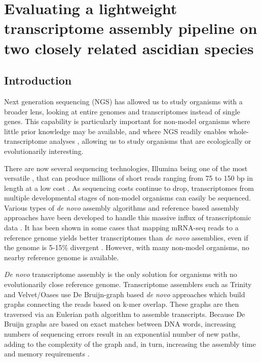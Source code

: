 \chapter{Evaluating a lightweight transcriptome assembly pipeline on two closely related ascidian species}



\section{Introduction}

Next generation sequencing (NGS) has allowed us to study organisms with a broader lens, looking at entire genomes and transcriptomes instead of single genes.  This capability is particularly important for non-model organisms where little prior knowledge may be available, and where NGS readily enables whole-transcriptome analyses \citep{wang_rna-seq:_2009}, allowing us to study organisms that are ecologically or evolutionarily interesting.

There are now several sequencing technologies, Illumina being one of the most versatile \citep{glenn_field_2011}, that can produce millions of short reads ranging from 75 to 150 bp in length at a low cost \citep{zhang_impact_2011}. As sequencing costs continue to drop, transcriptomes from multiple developmental stages of non-model organisms can easily be sequenced. Various types of \textit{de novo} assembly algorithms and reference based assembly approaches have been developed to handle this massive influx of transcriptomic data \citep{pop_genome_2009,vinson_assembly_2005,stapley_adaptation_2010}. It has been shown in some cases that mapping mRNA-seq reads to a reference genome yields better transcriptomes than \textit{de novo} assemblies, even if the genome is 5-15\% divergent \citep{vijay_challenges_2012}. However, with many non-model organisms, no nearby reference genome is available.

\textit{De novo} transcriptome assembly is the only solution for organisms with no evolutionarily close reference genome.  Transcriptome assemblers such as Trinity \citep{grabherr_full-length_2011} and Velvet/Oases \citep{zerbino_velvet:_2008,schulz_oases:_2012} use De Bruijn-graph based \textit{de novo} approaches which build graphs connecting the reads based on k-mer overlap. These graphs are then traversed via an Eulerian path algorithm to assemble transcripts. Because De Bruijn graphs are based on exact matches between DNA words, increasing numbers of sequencing errors result in an exponential number of new paths, adding to the complexity of the graph and, in turn, increasing the assembly time and memory requirements \citep{pop_genome_2009}.

